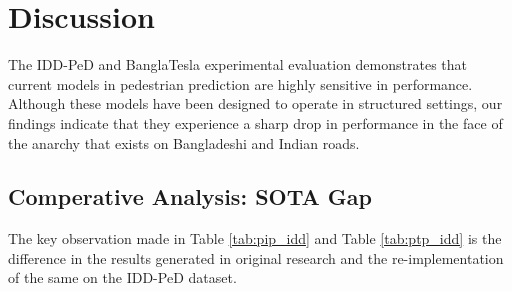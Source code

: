 \documentclass[12pt, a4paper]{article}
\begin{document}
%
%    
%    
%    

\clearpage
\section{Discussion}

The IDD-PeD \cite{bokkasam2025pedestrian} and BanglaTesla experimental evaluation demonstrates that current models in pedestrian prediction are highly sensitive in performance. Although these models have been designed to operate in structured settings, our findings indicate that they experience a sharp drop in performance in the face of the anarchy that exists on Bangladeshi and Indian roads.

\subsection{Comperative Analysis: SOTA Gap}


The key observation made in Table \ref{tab:pip_idd} and Table \ref{tab:ptp_idd} is the difference in the results generated in original research and the re-implementation of the same on the IDD-PeD dataset.
\end{document}
